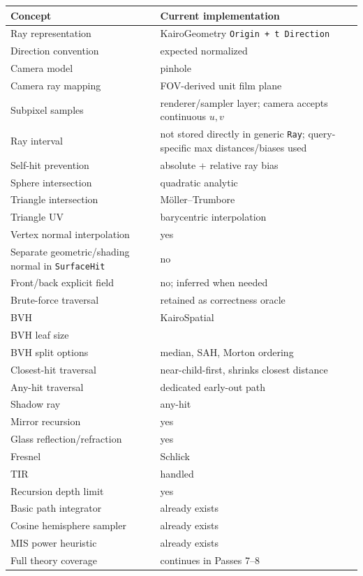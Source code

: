 {\def\LTcaptype{none} %
\begin{longtable}[]{@{}
  >{\raggedright\arraybackslash}p{}
  >{\raggedright\arraybackslash}p{}@{}}
\toprule\noalign{}
\begin{minipage}[b]{\linewidth}\raggedright
Concept
\end{minipage} & \begin{minipage}[b]{\linewidth}\raggedright
Current implementation
\end{minipage} \\
\midrule\noalign{}
\endhead
\bottomrule\noalign{}
\endlastfoot
Ray representation & KairoGeometry \texttt{Origin\ +\ t\ Direction} \\
Direction convention & expected normalized \\
Camera model & pinhole \\
Camera ray mapping & FOV-derived unit film plane \\
Subpixel samples & renderer/sampler layer; camera accepts continuous \(u,v\) \\
Ray interval & not stored directly in generic \texttt{Ray}; query-specific max distances/biases used \\
Self-hit prevention & absolute + relative ray bias \\
Sphere intersection & quadratic analytic \\
Triangle intersection & Möller--Trumbore \\
Triangle UV & barycentric interpolation \\
Vertex normal interpolation & yes \\
Separate geometric/shading normal in \texttt{SurfaceHit} & no \\
Front/back explicit field & no; inferred when needed \\
Brute-force traversal & retained as correctness oracle \\
BVH & KairoSpatial \\
BVH leaf size & 4 \\
BVH split options & median, SAH, Morton ordering \\
Closest-hit traversal & near-child-first, shrinks closest distance \\
Any-hit traversal & dedicated early-out path \\
Shadow ray & any-hit \\
Mirror recursion & yes \\
Glass reflection/refraction & yes \\
Fresnel & Schlick \\
TIR & handled \\
Recursion depth limit & yes \\
Basic path integrator & already exists \\
Cosine hemisphere sampler & already exists \\
MIS power heuristic & already exists \\
Full theory coverage & continues in Passes 7--8 \\
\end{longtable}
}

